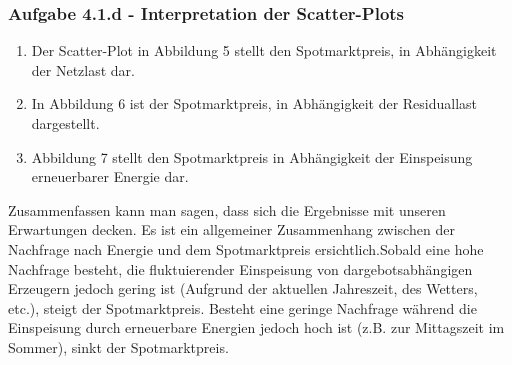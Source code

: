 \documentclass[a4paper,12pt]{article}
\begin{document}
	\subsubsection{Aufgabe 4.1.d - Interpretation der Scatter-Plots}
	\begin{enumerate}
		\item Der Scatter-Plot in Abbildung 5 stellt den Spotmarktpreis, in Abhängigkeit der Netzlast dar.\newline
		
		
		\item In Abbildung 6 ist der Spotmarktpreis, in Abhängigkeit der Residuallast dargestellt.\newline
		
		\item Abbildung 7 stellt den Spotmarktpreis in Abhängigkeit der Einspeisung erneuerbarer Energie dar.\newline
	\end{enumerate}
	Zusammenfassen kann man sagen, dass sich die Ergebnisse mit unseren Erwartungen decken. Es ist ein allgemeiner Zusammenhang zwischen der Nachfrage nach Energie und dem Spotmarktpreis ersichtlich.\newline Sobald eine hohe Nachfrage besteht, die fluktuierender Einspeisung von dargebotsabhängigen Erzeugern jedoch gering ist (Aufgrund der aktuellen Jahreszeit, des Wetters, etc.), steigt der Spotmarktpreis.\newline
	Besteht eine geringe Nachfrage während die Einspeisung durch erneuerbare Energien jedoch hoch ist (z.B. zur Mittagszeit im Sommer), sinkt der Spotmarktpreis.
	\newpage
	\listoffigures
\end{document}

